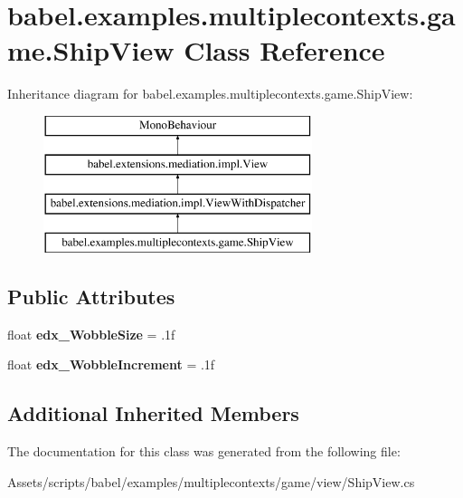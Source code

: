 \hypertarget{classbabel_1_1examples_1_1multiplecontexts_1_1game_1_1_ship_view}{\section{babel.\-examples.\-multiplecontexts.\-game.\-Ship\-View Class Reference}
\label{classbabel_1_1examples_1_1multiplecontexts_1_1game_1_1_ship_view}
}
Inheritance diagram for babel.\-examples.\-multiplecontexts.\-game.\-Ship\-View\-:\begin{figure}[H]
\begin{center}
\leavevmode
\includegraphics[height=4.000000cm]{classbabel_1_1examples_1_1multiplecontexts_1_1game_1_1_ship_view}
\end{center}
\end{figure}
\subsection*{Public Attributes}
\begin{DoxyCompactItemize}
\item 
\hypertarget{classbabel_1_1examples_1_1multiplecontexts_1_1game_1_1_ship_view_a0f3e27076cfa00c12e1d14225576f558}{float {\bfseries edx\-\_\-\-Wobble\-Size} = .\-1f}\label{classbabel_1_1examples_1_1multiplecontexts_1_1game_1_1_ship_view_a0f3e27076cfa00c12e1d14225576f558}

\item 
\hypertarget{classbabel_1_1examples_1_1multiplecontexts_1_1game_1_1_ship_view_a8898c9622071dad25f9ccfcdd449a316}{float {\bfseries edx\-\_\-\-Wobble\-Increment} = .\-1f}\label{classbabel_1_1examples_1_1multiplecontexts_1_1game_1_1_ship_view_a8898c9622071dad25f9ccfcdd449a316}

\end{DoxyCompactItemize}
\subsection*{Additional Inherited Members}


The documentation for this class was generated from the following file\-:\begin{DoxyCompactItemize}
\item 
Assets/scripts/babel/examples/multiplecontexts/game/view/Ship\-View.\-cs\end{DoxyCompactItemize}
